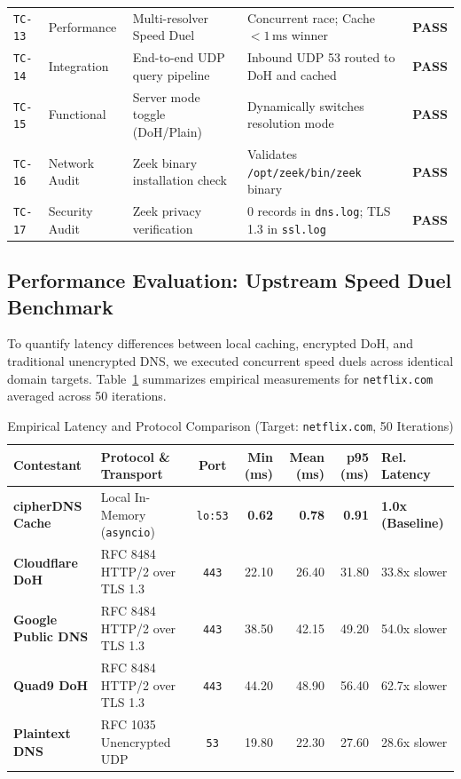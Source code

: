 \documentclass[10pt,a4paper]{article}
\begin{document}
\begin{table}[H]
\begin{tabularx}{\textwidth}{l l X p{3.4cm} c}
\texttt{TC-13} & Performance & Multi-resolver Speed Duel & Concurrent race; Cache $< 1\,\text{ms}$ winner & \textcolor{emeraldpass}{\textbf{PASS}} \\
\texttt{TC-14} & Integration & End-to-end UDP query pipeline & Inbound UDP 53 routed to DoH and cached & \textcolor{emeraldpass}{\textbf{PASS}} \\
\texttt{TC-15} & Functional & Server mode toggle (DoH/Plain) & Dynamically switches resolution mode & \textcolor{emeraldpass}{\textbf{PASS}} \\
\texttt{TC-16} & Network Audit & Zeek binary installation check & Validates \texttt{/opt/zeek/bin/zeek} binary & \textcolor{emeraldpass}{\textbf{PASS}} \\
\texttt{TC-17} & Security Audit & Zeek privacy verification & 0 records in \texttt{dns.log}; TLS 1.3 in \texttt{ssl.log} & \textcolor{emeraldpass}{\textbf{PASS}} \\
\bottomrule
\end{tabularx}
\end{table}

\subsection{Performance Evaluation: Upstream Speed Duel Benchmark}
To quantify latency differences between local caching, encrypted DoH, and traditional unencrypted DNS, we executed concurrent speed duels across identical domain targets. Table~\ref{tab:speed_duel} summarizes empirical measurements for \texttt{netflix.com} averaged across 50 iterations.

\begin{table}[H]
\centering
\small
\caption{Empirical Latency and Protocol Comparison (Target: \texttt{netflix.com}, 50 Iterations)}
\label{tab:speed_duel}
\begin{tabularx}{\textwidth}{l l c r r r >{\raggedright\arraybackslash}X}
\toprule
\textbf{Contestant} & \textbf{Protocol \& Transport} & \textbf{Port} & \textbf{Min (ms)} & \textbf{Mean (ms)} & \textbf{p95 (ms)} & \textbf{Rel. Latency} \\
\midrule
\textbf{cipherDNS Cache} & Local In-Memory (\texttt{asyncio}) & \texttt{lo:53} & \textbf{0.62} & \textbf{0.78} & \textbf{0.91} & \textbf{1.0x (Baseline)} \\
\textbf{Cloudflare DoH} & RFC 8484 HTTP/2 over TLS 1.3 & \texttt{443} & 22.10 & 26.40 & 31.80 & 33.8x slower \\
\textbf{Google Public DNS} & RFC 8484 HTTP/2 over TLS 1.3 & \texttt{443} & 38.50 & 42.15 & 49.20 & 54.0x slower \\
\textbf{Quad9 DoH} & RFC 8484 HTTP/2 over TLS 1.3 & \texttt{443} & 44.20 & 48.90 & 56.40 & 62.7x slower \\
\textbf{Plaintext DNS} & RFC 1035 Unencrypted UDP & \texttt{53} & 19.80 & 22.30 & 27.60 & 28.6x slower \\
\bottomrule
\end{tabularx}
\end{table}
\end{document}
